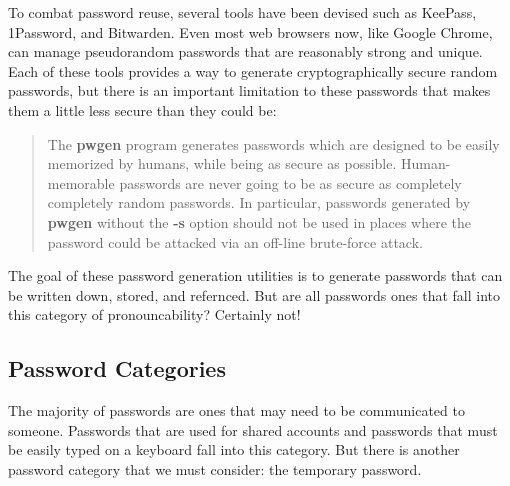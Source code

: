 To combat password reuse, several tools have been devised such as KeePass, 1Password, and Bitwarden. Even most web browsers now, like Google Chrome, can manage pseudorandom passwords that are reasonably strong and unique. Each of these tools provides a way to generate cryptographically secure random passwords, but there is an important limitation to these passwords that makes them a little less secure than they could be:
\begin{quote}
The \textbf{pwgen} program generates passwords which are designed to be easily memorized by humans, while being as secure as possible. Human-memorable passwords are never going to be as secure as completely completely random passwords. In particular, passwords generated by \textbf{pwgen} without the \textbf{-s} option should not be used in places where the password could be attacked via an off-line brute-force attack.\autocite{20210809:pwgen}
\end{quote}

The goal of these password generation utilities is to generate passwords that can be written down, stored, and refernced. But are all passwords ones that fall into this category of pronouncability? Certainly not!

\subsection{Password Categories}

The majority of passwords are ones that may need to be communicated to someone. Passwords that are used for shared accounts and passwords that must be easily typed on a keyboard fall into this category. But there is another password category that we must consider: the temporary password.
